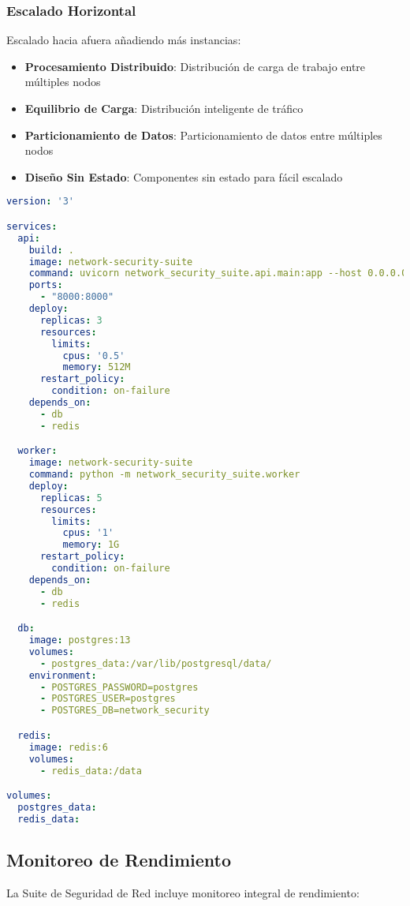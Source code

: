 \subsubsection{Escalado Horizontal}
Escalado hacia afuera añadiendo más instancias:

\begin{itemize}
    \item \textbf{Procesamiento Distribuido}: Distribución de carga de trabajo entre múltiples nodos
    \item \textbf{Equilibrio de Carga}: Distribución inteligente de tráfico
    \item \textbf{Particionamiento de Datos}: Particionamiento de datos entre múltiples nodos
    \item \textbf{Diseño Sin Estado}: Componentes sin estado para fácil escalado
\end{itemize}

\begin{lstlisting}[language=yaml, caption=Escalado con Docker Compose]
version: '3'

services:
  api:
    build: .
    image: network-security-suite
    command: uvicorn network_security_suite.api.main:app --host 0.0.0.0 --port 8000
    ports:
      - "8000:8000"
    deploy:
      replicas: 3
      resources:
        limits:
          cpus: '0.5'
          memory: 512M
      restart_policy:
        condition: on-failure
    depends_on:
      - db
      - redis

  worker:
    image: network-security-suite
    command: python -m network_security_suite.worker
    deploy:
      replicas: 5
      resources:
        limits:
          cpus: '1'
          memory: 1G
      restart_policy:
        condition: on-failure
    depends_on:
      - db
      - redis

  db:
    image: postgres:13
    volumes:
      - postgres_data:/var/lib/postgresql/data/
    environment:
      - POSTGRES_PASSWORD=postgres
      - POSTGRES_USER=postgres
      - POSTGRES_DB=network_security

  redis:
    image: redis:6
    volumes:
      - redis_data:/data

volumes:
  postgres_data:
  redis_data:
\end{lstlisting}

\subsection{Monitoreo de Rendimiento}
La Suite de Seguridad de Red incluye monitoreo integral de rendimiento:

